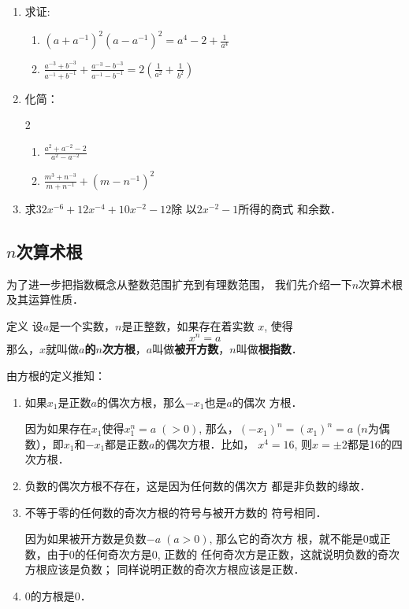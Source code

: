 \begin{enumerate}
\item 求证:
\begin{enumerate}
    \item $\left(a+a^{-1}\right)^{2}\left(a-a^{-1}\right)^{2}=a^{4}-2+\frac{1}{a^{4}}$
    \item $\frac{a^{-3}+b^{-3}}{a^{-1}+b^{-1}}+\frac{a^{-3}-b^{-3}}{a^{-1}-b^{-1}}=2\left(\frac{1}{a^{2}}+\frac{1}{b^{2}}\right)$
\end{enumerate}

\item 化简：
 \begin{multicols}{2}
\begin{enumerate}
    \item  $\frac{a^{2}+a^{-2}-2}{a^{2}-a^{-2}}$
    \item  $\frac{m^{3}+n^{-3}}{m+n^{-1}}+\left(m-n^{-1}\right)^{2}$
\end{enumerate}
\end{multicols}
\item 求$32x^{-6}+12x^{-4}+10x^{-2}-12$除
以$2x^{-2}-1$所得的商式
和余数．
\end{enumerate}

\subsection{$n$次算术根}
为了进一步把指数概念从整数范围扩充到有理数范围，
我们先介绍一下$n$次算术根及其运算性质．

\begin{blk}{定义}
 设$a$是一个实数，$n$是正整数，如果存在着实数
$x$, 使得
$$x^n=a$$
那么，$x$就叫做\textbf{$a$的$n$次方根}，$a$叫做\textbf{被开方数}，$n$叫做\textbf{根指数}．   
\end{blk}
 
由方根的定义推知：
\begin{enumerate}
    \item 如果$x_1$是正数$a$的偶次方根，那么$-x_1$也是$a$的偶次
    方根．

    因为如果存在$x_1$使得$x_1^n=a\; (>0)$, 那么，$(-x_1)^n=(x_1)^n=a$ ($n$为偶数），即$x_1$和$-x_1$都是正数$a$的偶次方根．比如，
$x^4=16$, 则$x=\pm 2$都是16的四次方根．
\item 负数的偶次方根不存在，这是因为任何数的偶次方
都是非负数的缘故．
\item 不等于零的任何数的奇次方根的符号与被开方数的
符号相同．

因为如果被开方数是负数$-a\; (a>0)$, 那么它的奇次方
根，就不能是0或正数，由于0的任何奇次方是0, 正数的
任何奇次方是正数，这就说明负数的奇次方根应该是负数；
同样说明正数的奇次方根应该是正数．
\item 0的方根是0．
\end{enumerate}

